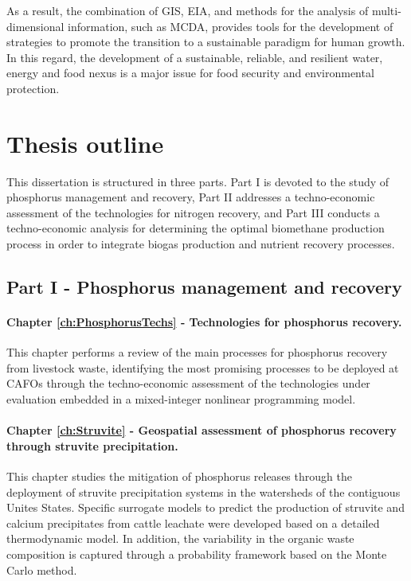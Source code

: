 \begin{refsection}[referencesCh1]
As a result, the combination of GIS, EIA, and methods for the analysis of multi-dimensional information, such as MCDA, provides tools for the development of strategies to promote the transition to a sustainable paradigm for human growth. In this regard, the development of a sustainable, reliable, and resilient water, energy and food nexus is a major issue for food security and environmental protection.

\section{Thesis outline}
This dissertation is structured in three parts. Part I is devoted to the study of phosphorus management and recovery, Part II addresses a techno-economic assessment of the technologies for nitrogen recovery, and Part III conducts a techno-economic analysis for determining the
optimal biomethane production process in order to integrate biogas production and nutrient recovery processes.

\subsection{Part I - Phosphorus management and recovery}
\paragraph{Chapter \ref{ch:PhosphorusTechs} - Technologies for phosphorus recovery.} This chapter performs a review of the main processes for phosphorus recovery from livestock waste, identifying the most promising processes to be deployed at CAFOs through the techno-economic assessment of the technologies under evaluation embedded in a mixed-integer nonlinear programming model.

\paragraph{Chapter \ref{ch:Struvite} - Geospatial assessment of phosphorus recovery through struvite precipitation.} This chapter studies the mitigation of phosphorus releases through the deployment of struvite precipitation systems in the watersheds of the contiguous Unites States. Specific surrogate models to predict the production of struvite and calcium precipitates from cattle leachate were developed based on a detailed thermodynamic model. In addition, the variability in the organic waste composition is captured through a probability framework based on the Monte Carlo method.


\end{refsection}
